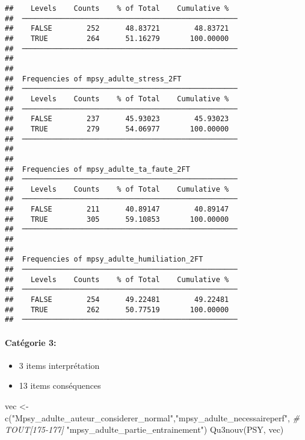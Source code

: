 \documentclass[
]{article}
\newenvironment{Shaded}{\begin{snugshade}}{\end{snugshade}}
\newcommand{\CommentTok}[1]{\textcolor[rgb]{0.56,0.35,0.01}{\textit{#1}}}
\newcommand{\FunctionTok}[1]{\textcolor[rgb]{0.00,0.00,0.00}{#1}}
\newcommand{\NormalTok}[1]{#1}
\newcommand{\OtherTok}[1]{\textcolor[rgb]{0.56,0.35,0.01}{#1}}
\newcommand{\StringTok}[1]{\textcolor[rgb]{0.31,0.60,0.02}{#1}}
\providecommand{\tightlist}{%
  \setlength{\itemsep}{0pt}\setlength{\parskip}{0pt}}
\begin{document}
\begin{verbatim}
##    Levels    Counts    % of Total    Cumulative %   
##  ────────────────────────────────────────────────── 
##    FALSE        252      48.83721        48.83721   
##    TRUE         264      51.16279       100.00000   
##  ────────────────────────────────────────────────── 
## 
## 
##  Frequencies of mpsy_adulte_stress_2FT              
##  ────────────────────────────────────────────────── 
##    Levels    Counts    % of Total    Cumulative %   
##  ────────────────────────────────────────────────── 
##    FALSE        237      45.93023        45.93023   
##    TRUE         279      54.06977       100.00000   
##  ────────────────────────────────────────────────── 
## 
## 
##  Frequencies of mpsy_adulte_ta_faute_2FT            
##  ────────────────────────────────────────────────── 
##    Levels    Counts    % of Total    Cumulative %   
##  ────────────────────────────────────────────────── 
##    FALSE        211      40.89147        40.89147   
##    TRUE         305      59.10853       100.00000   
##  ────────────────────────────────────────────────── 
## 
## 
##  Frequencies of mpsy_adulte_humiliation_2FT         
##  ────────────────────────────────────────────────── 
##    Levels    Counts    % of Total    Cumulative %   
##  ────────────────────────────────────────────────── 
##    FALSE        254      49.22481        49.22481   
##    TRUE         262      50.77519       100.00000   
##  ──────────────────────────────────────────────────
\end{verbatim}

\hypertarget{catuxe9gorie-3-1}{%
\paragraph{Catégorie 3:}\label{catuxe9gorie-3-1}}

\begin{itemize}
\tightlist
\item
  3 items interprétation
\item
  13 items conséquences
\end{itemize}

\begin{Shaded}
\begin{Highlighting}[]
\NormalTok{vec }\OtherTok{\textless{}{-}} \FunctionTok{c}\NormalTok{(}\StringTok{"Mpsy\_adulte\_auteur\_considerer\_normal"}\NormalTok{,}\StringTok{"mpsy\_adulte\_necessaireperf"}\NormalTok{,   }\CommentTok{\# TOUT[175{-}177]}
        \StringTok{"mpsy\_adulte\_partie\_entrainement"}\NormalTok{) }
\FunctionTok{Qu3nouv}\NormalTok{(PSY, vec)}
\end{Highlighting}
\end{Shaded}
\end{document}
